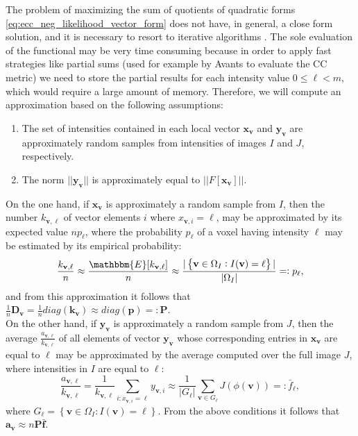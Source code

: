 The problem of maximizing the sum of quotients of quadratic forms \eqref{eq:ecc_neg_likelihood_vector_form} does not have, in general, a close form solution, and it is necessary to resort to iterative algorithms \cite{Kiers1995}. The sole evaluation of the functional may be very time consuming because in order to apply fast strategies like partial sums (used for example by Avants \cite{Avants2011} to evaluate the CC metric) we need to store the partial results for each intensity value $0 \leq \ell < m$, which would require a large amount of memory. Therefore, we will compute an approximation based on the following assumptions:
\begin{enumerate}
    \item The set of intensities contained in each local vector $\mathbf{x}_{\mathbf{v}}$ and $\mathbf{y}_{\mathbf{v}}$ are approximately random samples from intensities of images $I$ and $J$, respectively.
    \item The norm $||\mathbf{y}_{\mathbf{v}}||$ is approximately equal to $||F[\mathbf{x}_{\mathbf{v}}]||.$
\end{enumerate}
On the one hand, if $\mathbf{x}_{\mathbf{v}}$ is approximately a random sample from $I$, then the number $k_{\mathbf{v},\ell}$ of vector elements $i$ where $x_{\mathbf{v},i} = \ell$, may be approximated by its expected value $np_{\ell}$, where the probability $p_{\ell}$ of a voxel having intensity $\ell$ may be estimated by its empirical probability:
\begin{equation}
    \frac{k_{\mathbf{v}, \ell}}{n} \approx \frac{\mathbbm{E}[k_{\mathbf{v},\ell}]}{n} \approx \frac{|\left\lbrace \mathbf{v}\in\Omega_{I} : I(\mathbf{v}) = \ell\right\rbrace|}{|\Omega_{I}|} =: p_{\ell},
\end{equation}
and from this approximation it follows that $\frac{1}{n}\mathbf{D}_{\mathbf{v}} = \frac{1}{n}diag(\mathbf{k}_{\mathbf{v}}) \approx diag(\mathbf{p}) =: \mathbf{P}$.\\

On the other hand, if $\mathbf{y}_{\mathbf{v}}$ is approximately a random sample from $J$, then the average $\frac{a_{\mathbf{v},\ell}}{k_{\mathbf{v},\ell}}$ of all elements of vector $\mathbf{y}_{\mathbf{v}}$ whose corresponding entries in $\mathbf{x}_{\mathbf{v}}$ are equal to $\ell$ may be approximated by the average computed over the full image $J$, where intensities in $I$ are equal to $\ell$:
\begin{equation}\label{eq:average_of_isosets}
    \frac{a_{\mathbf{v},\ell}}{k_{\mathbf{v},\ell}} =  \frac{1}{k_{\mathbf{v},\ell}}\sum_{i:x_{\mathbf{v},i}=\ell} y_{\mathbf{v},i} \approx \frac{1}{|G_{\ell}|}\sum_{\mathbf{v}\in G_{\ell}} J(\phi(\mathbf{v}))
    =:\bar{f}_{\ell},
\end{equation}
where $G_{\ell} = \left\lbrace \mathbf{v}\in \Omega_{I}: I(\mathbf{v}) = \ell\right\rbrace$. From the above conditions it follows that $\mathbf{a}_{\mathbf{v}} \approx n \mathbf{P} \mathbf{\bar{f}}$.\\

